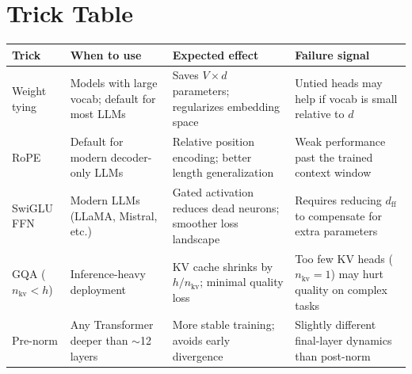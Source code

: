 \section{Trick Table}

\noindent
\begin{tabularx}{\textwidth}{@{}>{\raggedright\arraybackslash}p{2.8cm}
                              >{\raggedright\arraybackslash}p{2.8cm}
                              >{\raggedright\arraybackslash}p{3.2cm}
                              X@{}}
\toprule
\textbf{Trick} & \textbf{When to use} & \textbf{Expected effect} & \textbf{Failure signal} \\
\midrule
Weight tying &
  Models with large vocab; default for most LLMs &
  Saves $V \times d$ parameters; regularizes embedding space &
  Untied heads may help if vocab is small relative to $d$ \\[4pt]
RoPE &
  Default for modern decoder-only LLMs &
  Relative position encoding; better length generalization &
  Weak performance past the trained context window \\[4pt]
SwiGLU FFN &
  Modern LLMs (LLaMA, Mistral, etc.) &
  Gated activation reduces dead neurons; smoother loss landscape &
  Requires reducing $d_\text{ff}$ to compensate for extra parameters \\[4pt]
GQA ($n_\text{kv} < h$) &
  Inference-heavy deployment &
  KV cache shrinks by $h / n_\text{kv}$; minimal quality loss &
  Too few KV heads ($n_\text{kv} = 1$) may hurt quality on complex tasks \\[4pt]
Pre-norm &
  Any Transformer deeper than $\sim$12 layers &
  More stable training; avoids early divergence &
  Slightly different final-layer dynamics than post-norm \\
\bottomrule
\end{tabularx}


